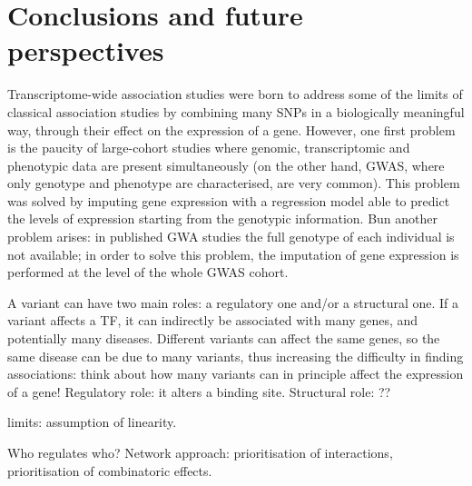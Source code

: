 \documentclass[../main.tex]{subfiles}
\begin{document}
\chapter{Conclusions and future perspectives}

Transcriptome-wide association studies were born to address some of the 
limits of classical association studies by combining many SNPs in a 
biologically meaningful way, \ie through their effect on the expression 
of a gene. However, one first problem is the paucity of large-cohort 
studies where genomic, transcriptomic and phenotypic data are present 
simultaneously (on the other hand, GWAS, where only genotype and 
phenotype are characterised, are very common). This problem was solved 
by imputing gene expression with a regression model able to predict the 
levels of expression starting from the genotypic information. Bun 
another problem arises: in published GWA studies the full genotype of 
each individual is not available; in order to solve this problem, the 
imputation of gene expression is performed at the level of the whole 
GWAS cohort.

A variant can have two main roles: a regulatory one and/or a structural 
one. If a variant affects a TF, it can indirectly be associated with 
many genes, and potentially many diseases. Different variants can affect 
the same genes, so the same disease can be due to many variants, thus 
increasing the difficulty in finding associations: think about how many 
variants can in principle affect the expression of a gene! Regulatory 
role: it alters a binding site. Structural role: ??

limits: assumption of linearity.

Who regulates who? Network approach: prioritisation of interactions, 
prioritisation of combinatoric effects.
\end{document}
